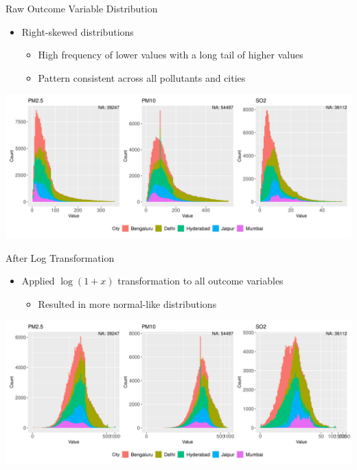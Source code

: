 \documentclass[svgnames, 12pt]{beamer}
\begin{document}
\begin{frame}{Raw Outcome Variable Distribution}
    \begin{itemize}
        \item Right-skewed distributions
            \begin{itemize}
                \item High frequency of lower values with a long tail of higher values
                \item Pattern consistent across all pollutants and cities
            \end{itemize}
    \end{itemize}
    \vspace{1em}
    \begin{center}
        \includegraphics[width=\textwidth]{assets/skewness.png}
    \end{center}
    \vfill
\end{frame}

\begin{frame}{After Log Transformation}
    \begin{itemize}
        \item Applied $\log(1 + x)$ transformation to all outcome variables
            \begin{itemize}
                \item Resulted in more normal-like distributions
            \end{itemize}
    \end{itemize}
    \vspace{1em}
    \begin{center}
        \includegraphics[width=\textwidth]{assets/log-scaled-pollutants.png}
    \end{center}
    \vfill
\end{frame}
\end{document}
